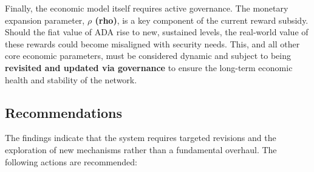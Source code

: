\documentclass[11pt, letterpaper]{article}
\begin{document}
Finally, the economic model itself requires active governance. The monetary expansion parameter,
\textbf{$\rho$ (rho)}, is a key component of the current reward subsidy. Should the fiat value of
ADA rise to new, sustained levels, the real-world value of these rewards could become misaligned
with security needs. This, and all other core economic parameters, must be considered dynamic and
subject to being \textbf{revisited and updated via governance} to ensure the long-term economic health
and stability of the network.

\subsection{Recommendations}
The findings indicate that the system requires targeted revisions and the
exploration of new mechanisms rather than a fundamental overhaul. The following
actions are recommended:
\end{document}
